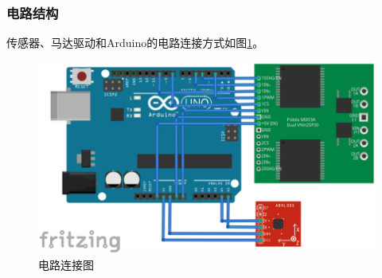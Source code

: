 \documentclass[a4paper]{ctexart}
\begin{document}
\begin{spacing}{1.5}
\subsubsection{电路结构}
传感器、马达驱动和Arduino的电路连接方式如图\ref{circ}。
\begin{figure}[htbp]
	\centering
	\includegraphics [width=\textwidth]{figure//circ.png}
	\caption{电路连接图}\label{circ}
\end{figure}

\end{spacing}
\end{document}

